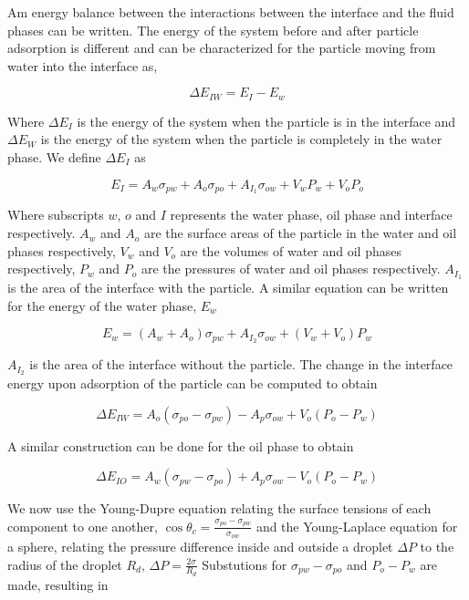 Am energy balance between the interactions between the interface and the fluid phases can be written. The energy of the system before and after particle adsorption is 
different and can be characterized for the particle moving from water into the interface as,

\begin{equation}
    \Delta E_{IW} = E_I - E_w
\end{equation}

Where $\Delta E_{I}$ is the energy of the system when the particle is in the interface and $\Delta E_W$ is the energy of the system when the particle is completely in the water phase.
We define $\Delta E_{I}$ as

\begin{equation}
    E_I = A_w \sigma_{pw} + A_o\sigma_{po} + A_{I_1}\sigma_{ow} + V_w P_w + V_o P_o
\end{equation}

Where subscripts $w$, $o$ and $I$ represents the water phase, oil phase and interface respectively. $A_w$ and $A_o$ are the surface areas of the particle in the water and oil phases 
respectively, $V_w$ and $V_o$ are the volumes of water and oil phases respectively, $P_w$ and $P_o$ are the pressures of water and oil phases respectively. $A_{I_1}$ is the area of the 
interface with the particle. A similar equation can be written for the energy of the water phase, $E_w$

\begin{equation}
    E_w = (A_w + A_o)\sigma_{pw} + A_{I_2}\sigma_{ow} + (V_w + V_o)P_w
\end{equation}

$A_{I_2}$ is the area of the interface without the particle. The change in the interface energy upon adsorption of the particle can be computed to obtain

\begin{equation}
    \Delta E_{IW} = A_o(\sigma_{po} - \sigma_{pw}) - A_p\sigma_{ow} + V_o(P_o - P_w)
\end{equation}

A similar construction can be done for the oil phase to obtain 

\begin{equation}
    \Delta E_{IO} = A_w(\sigma_{pw} - \sigma_{po}) + A_p\sigma_{ow} - V_o(P_o - P_w)
\end{equation}

We now use the Young-Dupre equation relating the surface tensions of each component to one another, $\cos{\theta_c} = \frac{\sigma_{po} - \sigma_{pw}}{\sigma_{ow}}$ and the
Young-Laplace equation for a sphere, relating the pressure difference inside and outside a droplet $\Delta P$ to the radius of the droplet $R_d$, $\Delta P = \frac{2\sigma}{R_d}$
Substutions for $\sigma_{pw} - \sigma_{po}$ and $P_o - P_w$ are made, resulting in 

